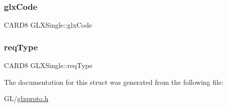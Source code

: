 \mbox{\label{struct_g_l_x_single_a5ecf5ecd2ba8596e9ee5af175225613f}} 
\subsubsection{\texorpdfstring{glx\+Code}{glxCode}}
{\footnotesize\ttfamily C\+A\+R\+D8 G\+L\+X\+Single\+::glx\+Code}

\mbox{\label{struct_g_l_x_single_a31797c1975abccb7ba81bb4753acc51c}} 
\subsubsection{\texorpdfstring{req\+Type}{reqType}}
{\footnotesize\ttfamily C\+A\+R\+D8 G\+L\+X\+Single\+::req\+Type}



The documentation for this struct was generated from the following file\+:\begin{DoxyCompactItemize}
\item 
G\+L/\hyperlink{glxproto_8h}{glxproto.\+h}\end{DoxyCompactItemize}
